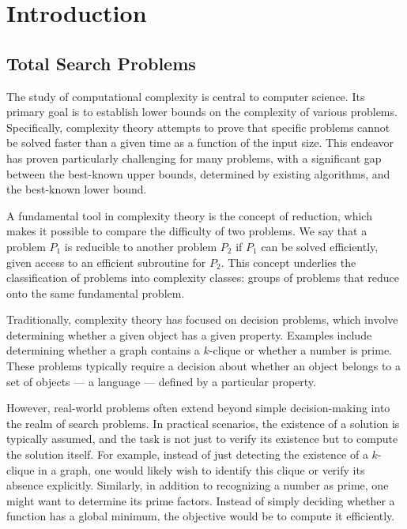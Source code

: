 \setchapterpreamble[u]{\margintoc}
\chapter{Introduction}

\section{Total Search Problems}

The study of computational complexity is central to computer science. Its primary goal is to establish lower bounds on the complexity of various problems. Specifically, complexity theory attempts to prove that specific problems cannot be solved faster than a given time as a function of the input size. This endeavor has proven particularly challenging for many problems, with a significant gap between the best-known upper bounds, determined by existing algorithms, and the best-known lower bound.

A fundamental tool in complexity theory is the concept of reduction, which makes it possible to compare the difficulty of two problems. We say that a problem $P_1$ is reducible to another problem $P_2$ if $P_1$ can be solved efficiently, given access to an efficient subroutine for $P_2$. This concept underlies the classification of problems into complexity classes: groups of problems that reduce onto the same fundamental problem.

Traditionally, complexity theory has focused on decision problems, which involve determining whether a given object has a given property. Examples include determining whether a graph contains a $k$-clique or whether a number is prime. These problems typically require a decision about whether an object belongs to a set of objects --- a language --- defined by a particular property.

However, real-world problems often extend beyond simple decision-making into the realm of search problems. In practical scenarios, the existence of a solution is typically assumed, and the task is not just to verify its existence but to compute the solution itself. For example, instead of just detecting the existence of a $k$-clique in a graph, one would likely wish to identify this clique or verify its absence explicitly. Similarly, in addition to recognizing a number as prime, one might want to determine its prime factors. Instead of simply deciding whether a function has a global minimum, the objective would be to compute it efficiently.

